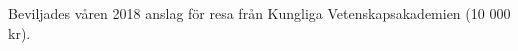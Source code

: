 

\begin{cvparagraph}

Beviljades v{\aa}ren 2018 anslag f{\"o}r resa fr{\aa}n Kungliga Vetenskapsakademien (10 000 kr).
\end{cvparagraph}